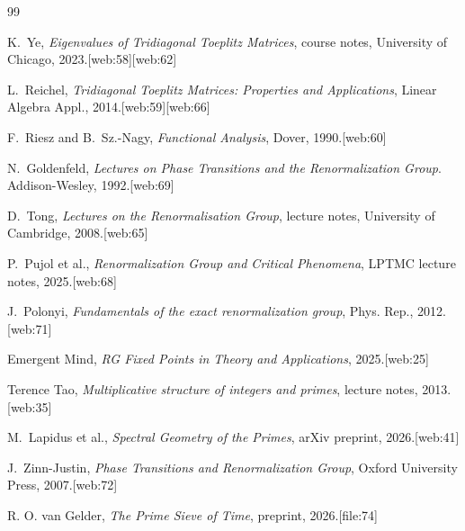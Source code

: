 \documentclass[11pt]{article}
\begin{document}

\begin{thebibliography}{99}

K.~Ye, \emph{Eigenvalues of Tridiagonal Toeplitz Matrices}, course notes, University of Chicago, 2023.[web:58][web:62]

L.~Reichel, \emph{Tridiagonal Toeplitz Matrices: Properties and Applications}, Linear Algebra Appl., 2014.[web:59][web:66]

F.~Riesz and B.~Sz.-Nagy, \emph{Functional Analysis}, Dover, 1990.[web:60]

N.~Goldenfeld, \emph{Lectures on Phase Transitions and the Renormalization Group}. Addison-Wesley, 1992.[web:69]

D.~Tong, \emph{Lectures on the Renormalisation Group}, lecture notes, University of Cambridge, 2008.[web:65]

P.~Pujol et al., \emph{Renormalization Group and Critical Phenomena}, LPTMC lecture notes, 2025.[web:68]

J.~Polonyi, \emph{Fundamentals of the exact renormalization group}, Phys. Rep., 2012.[web:71]

Emergent Mind, \emph{RG Fixed Points in Theory and Applications}, 2025.[web:25]

Terence Tao, \emph{Multiplicative structure of integers and primes}, lecture notes, 2013.[web:35]

M.~Lapidus et al., \emph{Spectral Geometry of the Primes}, arXiv preprint, 2026.[web:41]

J.~Zinn-Justin, \emph{Phase Transitions and Renormalization Group}, Oxford University Press, 2007.[web:72]

R. O. van Gelder, \emph{The Prime Sieve of Time}, preprint, 2026.[file:74]

\end{thebibliography}
\end{document}
